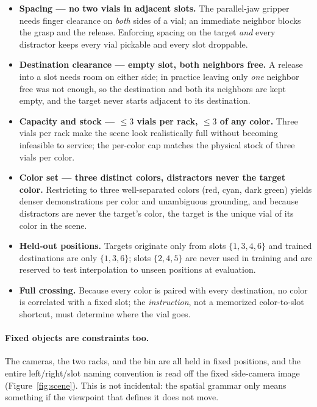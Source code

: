 \documentclass[11pt]{article}
\begin{document}
\begin{itemize}\itemsep3pt
  \item \textbf{Spacing --- no two vials in adjacent slots.} The parallel-jaw gripper
  needs finger clearance on \emph{both} sides of a vial; an immediate neighbor blocks
  the grasp and the release. Enforcing spacing on the target \emph{and} every
  distractor keeps every vial pickable and every slot droppable.
  \item \textbf{Destination clearance --- empty slot, both neighbors free.} A release
  into a slot needs room on either side; in practice leaving only \emph{one} neighbor
  free was not enough, so the destination and both its neighbors are kept empty, and
  the target never starts adjacent to its destination.
  \item \textbf{Capacity and stock --- $\le 3$ vials per rack, $\le 3$ of any color.}
  Three vials per rack make the scene look realistically full without becoming
  infeasible to service; the per-color cap matches the physical stock of three vials
  per color.
  \item \textbf{Color set --- three distinct colors, distractors never the target
  color.} Restricting to three well-separated colors (red, cyan, dark green) yields
  denser demonstrations per color and unambiguous grounding, and because distractors
  are never the target's color, the target is the unique vial of its color in the
  scene.
  \item \textbf{Held-out positions.} Targets originate only from slots $\{1,3,4,6\}$
  and trained destinations are only $\{1,3,6\}$; slots $\{2,4,5\}$ are never used in
  training and are reserved to test interpolation to unseen positions at evaluation.
  \item \textbf{Full crossing.} Because every color is paired with every destination,
  no color is correlated with a fixed slot; the \emph{instruction}, not a memorized
  color-to-slot shortcut, must determine where the vial goes.
\end{itemize}

\paragraph{Fixed objects are constraints too.}
The cameras, the two racks, and the bin are all held in fixed positions, and the
entire left/right/slot naming convention is read off the fixed side-camera image
(Figure~\ref{fig:scene}). This is not incidental: the spatial grammar only means
something if the viewpoint that defines it does not move.
\end{document}

